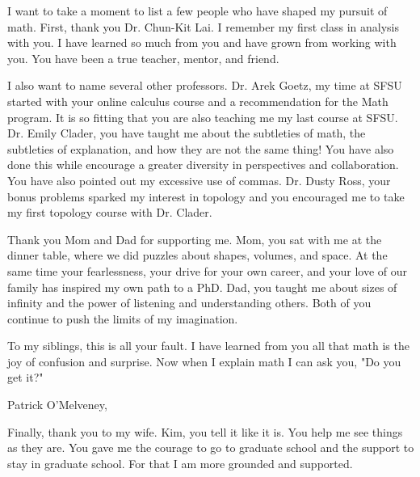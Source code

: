 \documentclass{article}
\begin{document}
I want to take a moment to list a few people who have shaped my pursuit of math.  First, thank you Dr. Chun-Kit Lai.  I remember my first class in analysis with you.  I have learned so much from you and have grown from working with you.  You have been a true teacher, mentor, and friend.  

I also want to name several other professors.  Dr. Arek Goetz, my time at SFSU started with your online calculus course and a recommendation for the Math program. It is so fitting that you are also teaching me my last course at SFSU.  Dr. Emily Clader, you have taught me about the subtleties of math, the subtleties of explanation, and how they are not the same thing! You have also done this while encourage a greater diversity in perspectives and collaboration.  You have also pointed out my excessive use of commas.  Dr. Dusty Ross, your bonus problems sparked my interest in topology and you encouraged me to take my first topology course with Dr. Clader.  

Thank you Mom and Dad for supporting me.  Mom, you sat with me at the dinner table, where we did puzzles about shapes, volumes, and space.  At the same time your fearlessness, your drive for your own career, and your love of our family has inspired my own path to a PhD.  Dad, you taught me about sizes of infinity and the power of listening and understanding others.  Both of you continue to push the limits of my imagination. 

To my siblings, this is all your fault.  
I have learned from you all that math is the joy of confusion and surprise.  Now when I explain math I can ask you, "Do you get it?"

Patrick O'Melveney, 

Finally, thank you to my wife.  Kim, you tell it like it is.  You help me see things as they are.  You gave me the courage to go to graduate school and the support to stay in graduate school.  For that I am more grounded and supported. 
\end{document}
